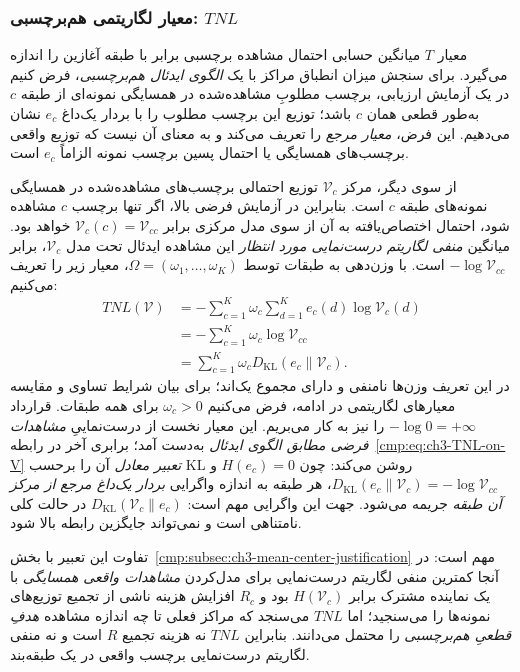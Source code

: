 \subsubsection{معیار لگاریتمی هم‌برچسبی: \texorpdfstring{$TNL$}{TNL}}
\label{cmp:subsubsec:ch3-TNL}
معیار $T$ میانگین حسابی احتمال مشاهده برچسبی برابر با طبقه آغازین را اندازه می‌گیرد. برای سنجش میزان انطباق مراکز با یک \emph{الگوی ایدئال هم‌برچسبی}، فرض کنیم در یک آزمایش ارزیابی، برچسب مطلوبِ مشاهده‌شده در همسایگی نمونه‌ای از طبقه $c$ به‌طور قطعی همان $c$ باشد؛ توزیع این برچسب مطلوب را با بردار یک‌داغ $e_c$ نشان می‌دهیم. این فرض، \emph{معیار مرجع} را تعریف می‌کند و به معنای آن نیست که توزیع واقعی برچسب‌های همسایگی یا احتمال پسین برچسب نمونه الزاماً $e_c$ است.

از سوی دیگر، مرکز $\mathcal V_c$ توزیع احتمالی برچسب‌های مشاهده‌شده در همسایگی نمونه‌های طبقه $c$ است. بنابراین در آزمایش فرضی بالا، اگر تنها برچسب $c$ مشاهده شود، احتمال اختصاص‌یافته به آن از سوی مدل مرکزی برابر $\mathcal V_c(c)=\mathcal V_{cc}$ خواهد بود. میانگین \emph{منفی لگاریتم درست‌نمایی مورد انتظار} این مشاهده ایدئال تحت مدل $\mathcal V_c$، برابر $-\log\mathcal V_{cc}$ است. با وزن‌دهی به طبقات توسط $\Omega=(\omega_1,\ldots,\omega_K)$، معیار زیر را تعریف می‌کنیم:
\begin{equation}\label{cmp:eq:ch3-TNL-on-V}
\boxed{
\begin{aligned}
TNL(\mathcal V)
&=-\sum_{c=1}^{K}\omega_c
\sum_{d=1}^{K}e_c(d)\log\mathcal V_c(d)\\
&=-\sum_{c=1}^{K}\omega_c\log\mathcal V_{cc}\\
&=\sum_{c=1}^{K}\omega_c
D_{\mathrm{KL}}(e_c\|\mathcal V_c).
\end{aligned}}
\end{equation}
در این تعریف وزن‌ها نامنفی و دارای مجموع یک‌اند؛
برای بیان شرایط تساوی و مقایسه معیارهای لگاریتمی
در ادامه، فرض می‌کنیم $\omega_c>0$ برای همه طبقات.
قرارداد $-\log0=+\infty$ را نیز به کار می‌بریم.
این معیار نخست از درست‌نماییِ \emph{مشاهدات فرضی
مطابق الگوی ایدئال} به‌دست آمد؛
برابری آخر در رابطه~\eqref{cmp:eq:ch3-TNL-on-V}
\emph{تعبیر معادل} آن را برحسب KL روشن می‌کند:
چون $H(e_c)=0$ و
$D_{\mathrm{KL}}(e_c\|\mathcal V_c)
=-\log\mathcal V_{cc}$،
هر طبقه به اندازه واگرایی
\emph{بردار یک‌داغ مرجع از مرکز آن طبقه}
جریمه می‌شود. جهت این واگرایی مهم است:
$D_{\mathrm{KL}}(\mathcal V_c\|e_c)$
در حالت کلی نامتناهی است و نمی‌تواند
جایگزین رابطه بالا شود.

تفاوت این تعبیر با بخش~\ref{cmp:subsec:ch3-mean-center-justification} مهم است: در آنجا کمترین منفی لگاریتم درست‌نمایی برای مدل‌کردن \emph{مشاهدات واقعی همسایگی} با یک نماینده مشترک برابر $H(\mathcal V_c)$ بود و $R_c$ افزایش هزینه ناشی از تجمیع توزیع‌های نمونه‌ها را می‌سنجید؛ اما $TNL$ می‌سنجد که مراکز فعلی تا چه اندازه مشاهده \emph{هدفِ قطعیِ هم‌برچسبی} را محتمل می‌دانند. بنابراین $TNL$ نه هزینه تجمیع $R$ است و نه منفی لگاریتم درست‌نمایی برچسب واقعی در یک طبقه‌بند.

